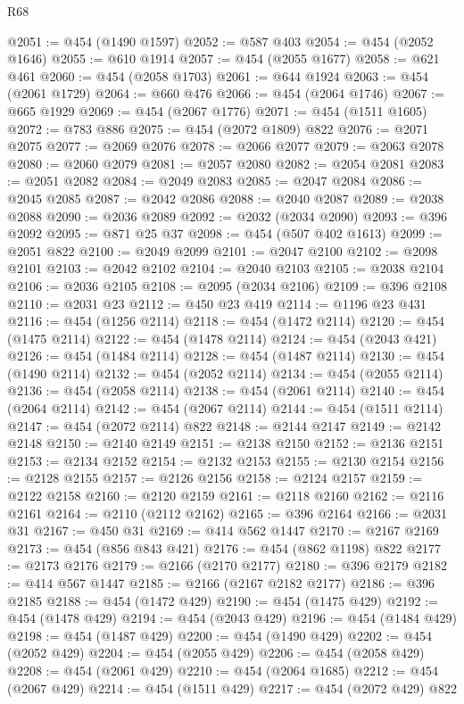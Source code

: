 \begin{lexlean}{R68}
\begin{coremodule}
@2051 := @454 (@1490 @1597)
@2052 := @587 @403
@2054 := @454 (@2052 @1646)
@2055 := @610 @1914
@2057 := @454 (@2055 @1677)
@2058 := @621 @461
@2060 := @454 (@2058 @1703)
@2061 := @644 @1924
@2063 := @454 (@2061 @1729)
@2064 := @660 @476
@2066 := @454 (@2064 @1746)
@2067 := @665 @1929
@2069 := @454 (@2067 @1776)
@2071 := @454 (@1511 @1605)
@2072 := @783 @886
@2075 := @454 (@2072 @1809) @822
@2076 := @2071 @2075
@2077 := @2069 @2076
@2078 := @2066 @2077
@2079 := @2063 @2078
@2080 := @2060 @2079
@2081 := @2057 @2080
@2082 := @2054 @2081
@2083 := @2051 @2082
@2084 := @2049 @2083
@2085 := @2047 @2084
@2086 := @2045 @2085
@2087 := @2042 @2086
@2088 := @2040 @2087
@2089 := @2038 @2088
@2090 := @2036 @2089
@2092 := @2032 (@2034 @2090)
@2093 := @396 @2092
@2095 := @871 @25 @37
@2098 := @454 (@507 @402 @1613)
@2099 := @2051 @822
@2100 := @2049 @2099
@2101 := @2047 @2100
@2102 := @2098 @2101
@2103 := @2042 @2102
@2104 := @2040 @2103
@2105 := @2038 @2104
@2106 := @2036 @2105
@2108 := @2095 (@2034 @2106)
@2109 := @396 @2108
@2110 := @2031 @23
@2112 := @450 @23 @419
@2114 := @1196 @23 @431
@2116 := @454 (@1256 @2114)
@2118 := @454 (@1472 @2114)
@2120 := @454 (@1475 @2114)
@2122 := @454 (@1478 @2114)
@2124 := @454 (@2043 @421)
@2126 := @454 (@1484 @2114)
@2128 := @454 (@1487 @2114)
@2130 := @454 (@1490 @2114)
@2132 := @454 (@2052 @2114)
@2134 := @454 (@2055 @2114)
@2136 := @454 (@2058 @2114)
@2138 := @454 (@2061 @2114)
@2140 := @454 (@2064 @2114)
@2142 := @454 (@2067 @2114)
@2144 := @454 (@1511 @2114)
@2147 := @454 (@2072 @2114) @822
@2148 := @2144 @2147
@2149 := @2142 @2148
@2150 := @2140 @2149
@2151 := @2138 @2150
@2152 := @2136 @2151
@2153 := @2134 @2152
@2154 := @2132 @2153
@2155 := @2130 @2154
@2156 := @2128 @2155
@2157 := @2126 @2156
@2158 := @2124 @2157
@2159 := @2122 @2158
@2160 := @2120 @2159
@2161 := @2118 @2160
@2162 := @2116 @2161
@2164 := @2110 (@2112 @2162)
@2165 := @396 @2164
@2166 := @2031 @31
@2167 := @450 @31
@2169 := @414 @562 @1447
@2170 := @2167 @2169
@2173 := @454 (@856 @843 @421)
@2176 := @454 (@862 @1198) @822
@2177 := @2173 @2176
@2179 := @2166 (@2170 @2177)
@2180 := @396 @2179
@2182 := @414 @567 @1447
@2185 := @2166 (@2167 @2182 @2177)
@2186 := @396 @2185
@2188 := @454 (@1472 @429)
@2190 := @454 (@1475 @429)
@2192 := @454 (@1478 @429)
@2194 := @454 (@2043 @429)
@2196 := @454 (@1484 @429)
@2198 := @454 (@1487 @429)
@2200 := @454 (@1490 @429)
@2202 := @454 (@2052 @429)
@2204 := @454 (@2055 @429)
@2206 := @454 (@2058 @429)
@2208 := @454 (@2061 @429)
@2210 := @454 (@2064 @1685)
@2212 := @454 (@2067 @429)
@2214 := @454 (@1511 @429)
@2217 := @454 (@2072 @429) @822

\end{coremodule}
\end{lexlean}
